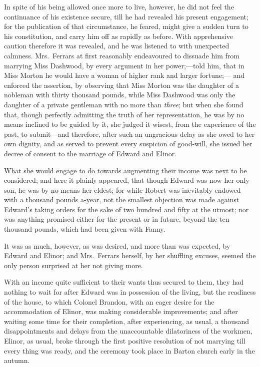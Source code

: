 \documentclass{article}
\begin{document}
In spite of his being allowed once more to live,
however, he did not feel the continuance of his existence
secure, till he had revealed his present engagement;
for the publication of that circumstance, he feared,
might give a sudden turn to his constitution, and carry
him off as rapidly as before.  With apprehensive caution
therefore it was revealed, and he was listened to with
unexpected calmness.  Mrs.\ Ferrars at first reasonably
endeavoured to dissuade him from marrying Miss Dashwood,
by every argument in her power;---told him, that in Miss Morton
he would have a woman of higher rank and larger fortune;---%
and enforced the assertion, by observing that Miss Morton
was the daughter of a nobleman with thirty thousand pounds,
while Miss Dashwood was only the daughter of a private
gentleman with no more than \emph{three}; but when she found that,
though perfectly admitting the truth of her representation,
he was by no means inclined to be guided by it,
she judged it wisest, from the experience of the past,
to submit---and therefore, after such an ungracious delay
as she owed to her own dignity, and as served to prevent
every suspicion of good-will, she issued her decree
of consent to the marriage of Edward and Elinor.

What she would engage to do towards augmenting
their income was next to be considered; and here it
plainly appeared, that though Edward was now her only son,
he was by no means her eldest; for while Robert was
inevitably endowed with a thousand pounds a-year,
not the smallest objection was made against Edward's taking
orders for the sake of two hundred and fifty at the utmost;
nor was anything promised either for the present or in future,
beyond the ten thousand pounds, which had been given with Fanny.

It was as much, however, as was desired,
and more than was expected, by Edward and Elinor;
and Mrs.\ Ferrars herself, by her shuffling excuses,
seemed the only person surprised at her not giving more.

With an income quite sufficient to their wants
thus secured to them, they had nothing to wait for
after Edward was in possession of the living, but the
readiness of the house, to which Colonel Brandon,
with an eager desire for the accommodation of Elinor,
was making considerable improvements; and after waiting
some time for their completion, after experiencing,
as usual, a thousand disappointments and delays
from the unaccountable dilatoriness of the workmen, Elinor,
as usual, broke through the first positive resolution
of not marrying till every thing was ready, and the
ceremony took place in Barton church early in the autumn.
\end{document}
